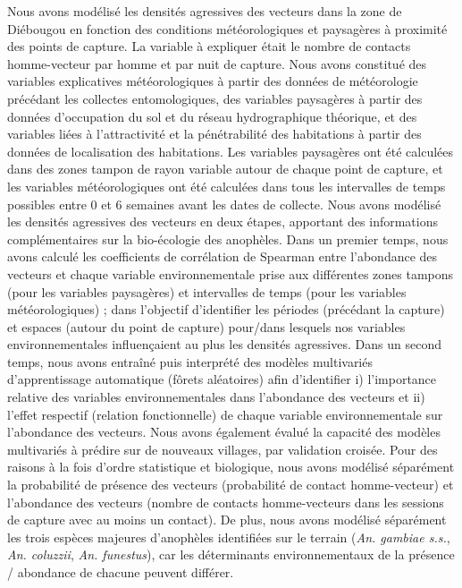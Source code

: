 \documentclass[12pt,twoside]{reedthesis}
\begin{document}
Nous avons modélisé les densités agressives des vecteurs dans la zone de Diébougou en fonction des conditions météorologiques et paysagères à proximité des points de capture. La variable à expliquer était le nombre de contacts homme-vecteur par homme et par nuit de capture. Nous avons constitué des variables explicatives météorologiques à partir des données de météorologie précédant les collectes entomologiques, des variables paysagères à partir des données d'occupation du sol et du réseau hydrographique théorique, et des variables liées à l'attractivité et la pénétrabilité des habitations à partir des données de localisation des habitations. Les variables paysagères ont été calculées dans des zones tampon de rayon variable autour de chaque point de capture, et les variables météorologiques ont été calculées dans tous les intervalles de temps possibles entre 0 et 6 semaines avant les dates de collecte. Nous avons modélisé les densités agressives des vecteurs en deux étapes, apportant des informations complémentaires sur la bio-écologie des anophèles. Dans un premier temps, nous avons calculé les coefficients de corrélation de Spearman entre l'abondance des vecteurs et chaque variable environnementale prise aux différentes zones tampons (pour les variables paysagères) et intervalles de temps (pour les variables météorologiques) ; dans l'objectif d'identifier les périodes (précédant la capture) et espaces (autour du point de capture) pour/dans lesquels nos variables environnementales influençaient au plus les densités agressives. Dans un second temps, nous avons entraîné puis interprété des modèles multivariés d'apprentissage automatique (fôrets aléatoires) afin d'identifier i) l'importance relative des variables environnementales dans l'abondance des vecteurs et ii) l'effet respectif (relation fonctionnelle) de chaque variable environnementale sur l'abondance des vecteurs. Nous avons également évalué la capacité des modèles multivariés à prédire sur de nouveaux villages, par validation croisée. Pour des raisons à la fois d'ordre statistique et biologique, nous avons modélisé séparément la probabilité de présence des vecteurs (probabilité de contact homme-vecteur) et l'abondance des vecteurs (nombre de contacts homme-vecteurs dans les sessions de capture avec au moins un contact). De plus, nous avons modélisé séparément les trois espèces majeures d'anophèles identifiées sur le terrain (\emph{An. gambiae s.s.}, \emph{An. coluzzii}, \emph{An. funestus}), car les déterminants environnementaux de la présence / abondance de chacune peuvent différer.\\
\end{document}
